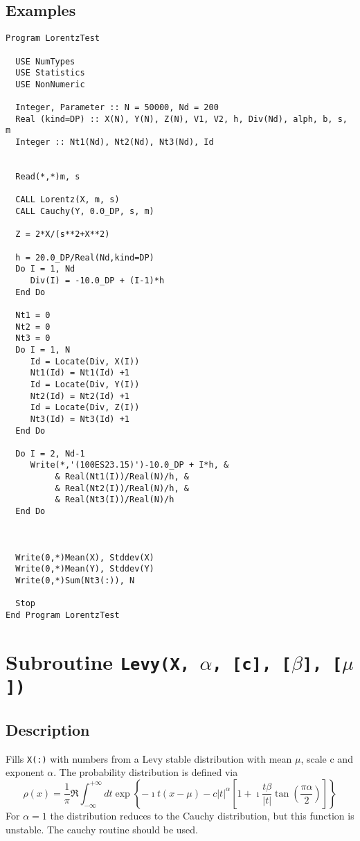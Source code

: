 \subsection{Examples}

\begin{lstlisting}[emph=Lorentz,
                   emphstyle=\color{blue},
                   frame=trBL,
                   caption=Comparing Lorentz and Cauchy routines.,
                   label=lorentz]
Program LorentzTest

  USE NumTypes
  USE Statistics
  USE NonNumeric

  Integer, Parameter :: N = 50000, Nd = 200
  Real (kind=DP) :: X(N), Y(N), Z(N), V1, V2, h, Div(Nd), alph, b, s, m
  Integer :: Nt1(Nd), Nt2(Nd), Nt3(Nd), Id
  

  Read(*,*)m, s
 
  CALL Lorentz(X, m, s)
  CALL Cauchy(Y, 0.0_DP, s, m)

  Z = 2*X/(s**2+X**2)

  h = 20.0_DP/Real(Nd,kind=DP)
  Do I = 1, Nd
     Div(I) = -10.0_DP + (I-1)*h
  End Do

  Nt1 = 0
  Nt2 = 0
  Nt3 = 0
  Do I = 1, N
     Id = Locate(Div, X(I))
     Nt1(Id) = Nt1(Id) +1
     Id = Locate(Div, Y(I))
     Nt2(Id) = Nt2(Id) +1
     Id = Locate(Div, Z(I))
     Nt3(Id) = Nt3(Id) +1
  End Do

  Do I = 2, Nd-1
     Write(*,'(100ES23.15)')-10.0_DP + I*h, &
          & Real(Nt1(I))/Real(N)/h, &
          & Real(Nt2(I))/Real(N)/h, &
          & Real(Nt3(I))/Real(N)/h
  End Do



  Write(0,*)Mean(X), Stddev(X)
  Write(0,*)Mean(Y), Stddev(Y)
  Write(0,*)Sum(Nt3(:)), N

  Stop
End Program LorentzTest
\end{lstlisting}


\section{Subroutine \texttt{Levy(X, $\alpha$, [c], [$\beta$], [$\mu$])}}

\subsection{Description}

Fills \texttt{X(:)} with numbers from a Levy stable distribution with
mean $\mu$, scale c and exponent $\alpha$. The probability
distribution is defined via
\begin{equation}
  \rho(x) = \frac{1}{\pi} \Re\int_{-\infty}^{+\infty} dt 
  \exp\left\{ -\imath t (x-\mu) - c|t|^\alpha\left[1+\imath\frac{t\beta}{|t|}\tan\left(\frac{\pi\alpha}{2}\right)\right] \right\}
\end{equation}
For $\alpha = 1$ the
distribution reduces to the Cauchy distribution, but this function is
unstable. The cauchy routine should be used.

